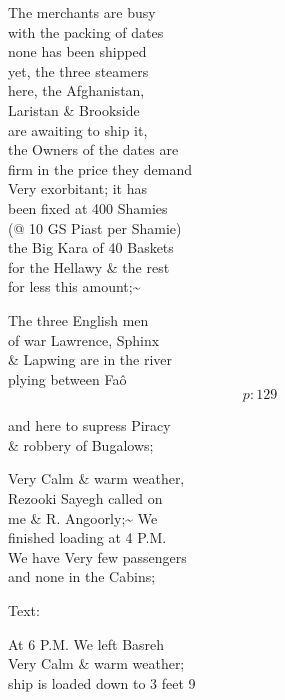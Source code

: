 \documentclass{report}
\begin{document}
	\par{
 	The merchants are busy\ \\with the packing of dates\ \\none has been shipped\ \\yet, the three steamers\ \\here, the Afghanistan,\ \\Laristan \& Brookside\ \\are awaiting to ship it,\ \\the Owners of the dates are\ \\firm in the price they demand\ \\Very exorbitant; it has\ \\been fixed at 400 Shamies\ \\(@ 10 GS Piast per Shamie)\ \\the Big Kara of 40 Baskets\ \\for the Hellawy \& the rest\ \\for less this amount;\~{}\ \\
	}

	\par{
 	The three English men\ \\of war Lawrence, Sphinx\ \\\& Lapwing are in the river\ \\plying between Faô\ \\
  \[p: 129 \]

	}



	\par{
 	and here to supress Piracy\ \\\& robbery of Bugalows;\ \\
	}

	\par{
 	Very Calm \& warm weather,\ \\Rezooki Sayegh called on\ \\me \& R. Angoorly;\~{} We\ \\finished loading at 4 P.M.\ \\We have Very few passengers\ \\and none in the Cabins;\ \\
	}

	\par{
 	Text:\ \\
	}

	\par{
 	At 6 P.M. We left Basreh\ \\Very Calm \& warm weather;\ \\ship is loaded down to 3 feet 9\ \\
	}
\end{document}
